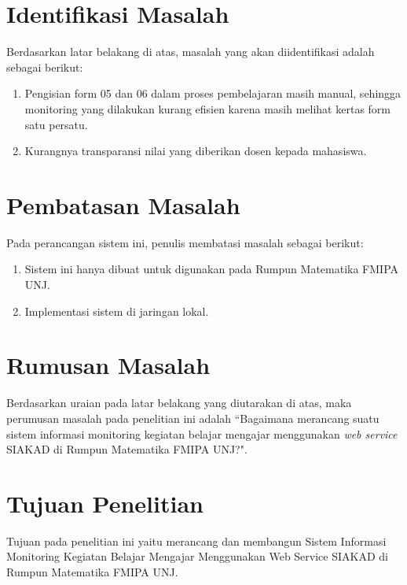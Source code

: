 	
\section{Identifikasi Masalah}
Berdasarkan latar belakang di atas, masalah yang akan diidentifikasi adalah sebagai berikut: 
\begin{enumerate}
	\item Pengisian form 05 dan 06 dalam proses pembelajaran masih manual, sehingga monitoring yang dilakukan kurang efisien karena masih melihat kertas form satu persatu.
	\item Kurangnya transparansi nilai yang diberikan dosen kepada mahasiswa.
\end{enumerate}

\section{Pembatasan Masalah}
Pada perancangan sistem ini, penulis membatasi masalah sebagai berikut:
\begin{enumerate}
	\item Sistem ini hanya dibuat untuk digunakan pada Rumpun Matematika FMIPA UNJ.
	\item Implementasi sistem di jaringan lokal.
\end{enumerate}

\section{Rumusan Masalah}
Berdasarkan uraian pada latar belakang yang diutarakan di atas, maka perumusan masalah pada penelitian ini adalah “Bagaimana merancang suatu sistem informasi monitoring kegiatan belajar mengajar menggunakan \textit{web service} SIAKAD di Rumpun Matematika FMIPA UNJ?".


\section{Tujuan Penelitian}
Tujuan pada penelitian ini yaitu merancang dan membangun Sistem Informasi Monitoring Kegiatan Belajar Mengajar Menggunakan Web Service SIAKAD di Rumpun Matematika FMIPA UNJ.

